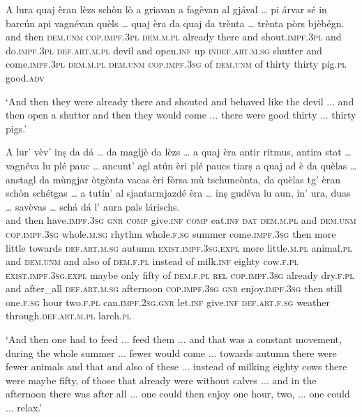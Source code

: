 \begin{linenumbers}
	\gll  A lura quaj èran lèzs schòn lò a griavan a fagèvan al gjával … pi\footnotemark{} árvar sé in barcún api vagnévan quèls … quaj èra da quaj da trènta … trènta pòrs bjèbégn.  \\
	and then \textsc{dem.unm} \textsc{cop.impf.3pl} \textsc{dem.m.pl} already there and shout.\textsc{impf.3pl} and do.\textsc{impf.3pl} \textsc{def.art.m.pl} devil {} and open.\textsc{inf} up \textsc{indef.art.m.sg} shutter and come.\textsc{impf.3pl} \textsc{dem.m.pl} {} \textsc{dem.unm} \textsc{cop.impf.3sg} of \textsc{dem.unm} of thirty {} thirty pig.\textsc{pl} good.\textsc{adv} \\
\end{linenumbers}
\medskip
\glt `And then they were already there and shouted and behaved like the devil ... and then open a shutter and then they would come ... there were good thirty ... thirty pigs.'
\medskip

\begin{linenumbers}
	\gll A lur' vèv’ inṣ da dá … da magljè da lèzs … a quaj èra antir ritmus, antira stat … vagnéva lu plé pauc  … ancunt’ agl atún èri plé paucs tiarṣ a quaj ad è da quèlas … anstagl da mùngjar òtgònta vacas èri fòrsa mù tschuncònta, da quèlas tg’ èran schòn schétgas … a tutín’ al sjantarmjazdé èra … inṣ gudéva lu aun, in’ ura, duas … savèvas … schá dá l’ aura pals lárischs.\\
	and then have.\textsc{impf.3sg} \textsc{gnr} \textsc{comp} give.\textsc{inf} {} \textsc{comp} eat.\textsc{inf} \textsc{dat} \textsc{dem.m.pl} {} and \textsc{dem.unm} \textsc{cop.impf.3sg} whole.\textsc{m.sg} rhythm whole.\textsc{f.sg} summer {} come.\textsc{impf.3sg} then more little {} towards \textsc{def.art.m.sg} autumn \textsc{exist.impf.3sg.expl} more little.\textsc{m.pl} animal.\textsc{pl} and \textsc{dem.unm} and also of \textsc{dem.f.pl} {} instead of milk.\textsc{inf} eighty cow.\textsc{f.pl} \textsc{exist.impf.3sg.expl} maybe only fifty of \textsc{dem.f.pl} \textsc{rel} \textsc{cop.impf.3sg} already dry.\textsc{f.pl} {} and after\_all \textsc{def.art.m.sg} afternoon \textsc{cop.impf.3sg} {} \textsc{gnr} enjoy.\textsc{impf.3sg} then still one.\textsc{f.sg} hour two.\textsc{f.pl} {} can.\textsc{impf.2sg.gnr} {} let.\textsc{inf} give.\textsc{inf} \textsc{def.art.f.sg} weather through.\textsc{def.art.m.pl} larch.\textsc{pl}\\
\end{linenumbers}
\medskip
\glt `And then one had to feed ... feed them ... and that was a constant movement, during the whole summer ... fewer would come ... towards autumn there were fewer animals and that and also of these ... instead of milking eighty cows there were maybe fifty, of those that already were without calves ... and in the afternoon there was after all ... one could then enjoy one hour, two, ... one could ... relax.'
\medskip


